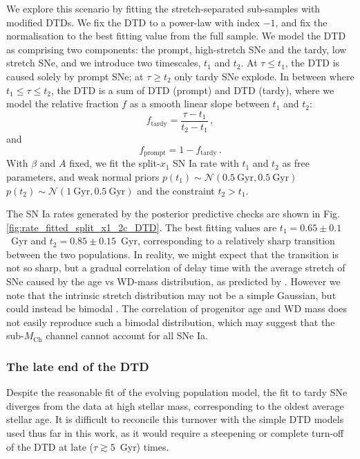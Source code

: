 \documentclass[fleqn,usenatbib]{mnras}
\begin{document}
We explore this scenario by fitting the stretch-separated sub-samples with modified DTDs. We fix the DTD to a power-law with index $-1$, and fix the normalisation to the best fitting value from the full sample. We model the DTD as comprising two components: the prompt, high-stretch SNe and the tardy, low stretch SNe, and we introduce two timescales, $t_1$ and $t_2$. At $\tau\leq t_1$, the DTD is caused solely by prompt SNe; at $\tau \geq t_2$ only tardy SNe explode. In between where $t_1 \leq\tau\leq t_2$, the DTD is a sum of DTD (prompt) and DTD (tardy), where we model the relative fraction $f$ as a smooth linear slope between $t_1$ and $t_2$:
\begin{equation}
    f_{\mathrm{tardy}} = \frac{\tau - t_1}{t_2 - t_1}\,,
\end{equation}
and
\begin{equation}
    f_{\mathrm{prompt}} = 1 - f_{\mathrm{tardy}}\,.
\end{equation}
With $\beta$ and $A$ fixed,  we fit the split-$x_1$ SN Ia rate with $t_1$ and $t_2$ as free parameters, and weak normal priors $p(t_1) \sim \mathcal{N}\left(0.5~\mathrm{Gyr}, 0.5~\mathrm{Gyr}\right)$ $p(t_2) \sim \mathcal{N}\left(1~\mathrm{Gyr}, 0.5~\mathrm{Gyr}\right)$ and the constraint $t_2 > t_1$.

The SN Ia rates generated by the posterior predictive checks are shown in Fig. \ref{fig:rate_fitted_split_x1_2c_DTD}. The best fitting values are $t_1 = 0.65 \pm 0.1$~Gyr and $t_2 = 0.85 \pm 0.15$~Gyr, corresponding to a relatively sharp transition between the two populations. In reality, we might expect that the transition is not so sharp, but a gradual correlation of delay time with the average stretch of SNe caused by the age vs WD-mass distribution, as predicted by \citet{Shen2021}. However we note that the intrinsic stretch distribution may not be a simple Gaussian, but could instead be bimodal \citep{Scolnic2016,Popovic2021}. The correlation of progenitor age and WD mass does not easily reproduce such a bimodal distribution, which may suggest that the sub-$M_{\mathrm{Ch}}$ channel cannot account for all SNe Ia. 

\subsubsection{The late end of the DTD \label{subsubsec:subtypes}}

Despite the reasonable fit of the evolving population model, the fit to tardy SNe diverges from the data at high stellar mass, corresponding to the oldest average stellar age. It is difficult to reconcile this turnover with the simple DTD models used thus far in this work, as it would require a steepening or complete turn-off of the DTD at late ($\tau\gtrsim 5$~Gyr) times.
\end{document}
